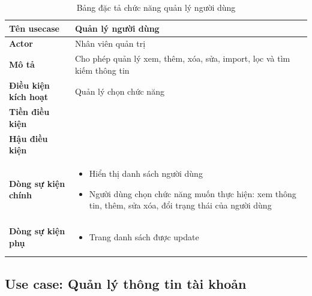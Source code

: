 \documentclass[report.tex]{subfiles}
\begin{document}
\begin{table}[!ht]
\begin{longtable}{|p{4cm}|p{12cm}|}
\hline
\textbf{Tên usecase} & \textbf{Quản lý người dùng} \\
\hline
\textbf{Actor} & Nhân viên quản trị \\
\hline
\textbf{Mô tả} & Cho phép quản lý xem, thêm, xóa, sửa, import, lọc và tìm kiếm thông tin \\
\hline
\textbf{Điều kiện kích hoạt} & Quản lý chọn chức năng \\
\hline
\textbf{Tiền điều kiện} & \\
\hline
\textbf{Hậu điều kiện} & \\
\hline
\textbf{Dòng sự kiện chính} &
\begin{itemize}[noitemsep]
  \item Hiển thị danh sách người dùng
  \item Người dùng chọn chức năng muốn thực hiện: xem thông tin, thêm, sửa xóa, đổi trạng thái của người dùng
\end{itemize}\\
\hline
\textbf{Dòng sự kiện phụ} & 
\begin{itemize}[noitemsep]
  \item Trang danh sách được update
\end{itemize}\\
\hline
\caption{Bảng đặc tả chức năng quản lý người dùng}
\end{longtable}
\end{table}
\FloatBarrier

\subsection{Use case: Quản lý thông tin tài khoản}
\end{document}
